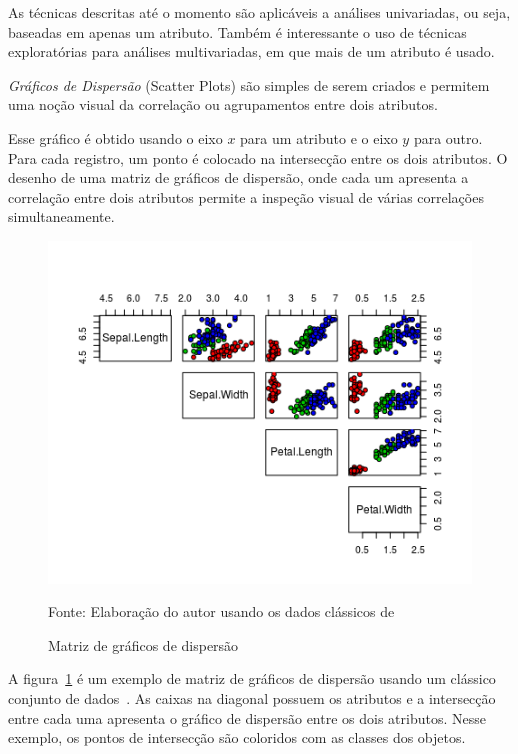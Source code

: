 \documentclass[12pt,a4paper]{article}
\newcommand{\source}[1]{\vspace{-10pt} \caption*{Fonte: {#1}} }
\begin{document}
As técnicas descritas até o momento são aplicáveis a análises univariadas, ou seja, baseadas em apenas um atributo. Também é interessante o uso de técnicas exploratórias para análises multivariadas, em que mais de um atributo é usado.

\textit{Gráficos de Dispersão} (Scatter Plots) são simples de serem criados e permitem uma noção visual da correlação ou agrupamentos entre dois atributos.

Esse gráfico é obtido usando o eixo $x$ para um atributo e o eixo $y$ para outro. Para cada registro, um ponto é colocado na intersecção entre os dois atributos. O desenho de uma matriz de gráficos de dispersão, onde cada um apresenta a correlação entre dois atributos permite a inspeção visual de várias correlações simultaneamente.

\begin{figure}[ht]
  \centering
  \includegraphics[scale=1]{scatterplot_matrix.png}
  \caption{Matriz de gráficos de dispersão}
  \label{fig:exemplo-de-matriz-de-dispersao}
  \source{Elaboração do autor usando os dados clássicos de \citeonline{Anderson1936-zq}}
\end{figure}

A figura~\ref{fig:exemplo-de-matriz-de-dispersao} é um exemplo de matriz de gráficos de dispersão usando um clássico conjunto de dados~. As caixas na diagonal possuem os atributos e a intersecção entre cada uma apresenta o gráfico de dispersão entre os dois atributos. Nesse exemplo, os pontos de intersecção são coloridos com as classes dos objetos.
\end{document}
